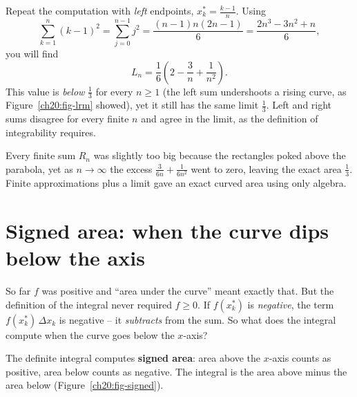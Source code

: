 \begin{labbox}
Repeat the computation with \emph{left} endpoints, $x_k^\ast = \tfrac{k-1}{n}$.
Using
\[
  \sum_{k=1}^n (k-1)^2 = \sum_{j=0}^{n-1} j^2 = \frac{(n-1)n(2n-1)}{6}
  = \frac{2n^3 - 3n^2 + n}{6},
\]
you will find
\[
  L_n = \frac{1}{6}\left(2 - \frac{3}{n} + \frac{1}{n^2}\right).
\]
This value is \emph{below} $\tfrac13$ for every $n \ge 1$ (the left sum
undershoots a rising curve, as Figure~\ref{ch20:fig-lrm} showed), yet it still
has the same limit $\tfrac13$. Left and right sums disagree for every finite $n$
and agree in the limit, as the definition of integrability requires.
\end{labbox}

\begin{aestheticbox}
Every finite sum $R_n$ was slightly too big because the rectangles poked above the parabola, yet as $n\to\infty$ the excess $\tfrac{3}{6n} + \tfrac{1}{6n^2}$ went to zero, leaving the exact area $\tfrac13$. Finite approximations plus a limit gave an exact curved area using only algebra.
\end{aestheticbox}

\section{Signed area: when the curve dips below the axis}
\label{ch20:signed-area}

So far $f$ was positive and ``area under the curve'' meant exactly that. But the
definition of the integral never required $f \ge 0$. If $f(x_k^\ast)$ is
\emph{negative}, the term $f(x_k^\ast)\,\Delta x_k$ is negative -- it
\emph{subtracts} from the sum. So what does the integral compute when the curve
goes below the $x$-axis?

\begin{focusbox}
The definite integral computes \textbf{signed area}: area above the $x$-axis
counts as positive, area below counts as negative. The integral is the area
above minus the area below (Figure~\ref{ch20:fig-signed}).
\end{focusbox}

